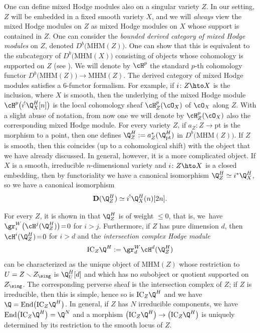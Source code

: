 One can define mixed Hodge modules also on a singular variety $Z$. In our setting, $Z$ will be embedded in a fixed smooth variety $X$,
and we will \emph{always} view the mixed Hodge modules on $Z$ as mixed Hodge modules on $X$
whose support is contained in $Z$. One can consider the \emph{bounded derived category of mixed Hodge modules} on $Z$, denoted $D^b\big(\mathrm{MHM}(Z)\big)$.
One can show that this is equivalent to the subcategory of $D^b\big(\mathrm{MHM}(X)\big)$ consisting of objects whose cohomology is supported on $Z$ (see \cite[Cor.\,2.23]{Saito_MHM}).
We will denote by $\cH^p$ the standard $p$-th cohomology functor $D^b\big(\mathrm{MHM}(Z)\big)\to \mathrm{MHM}(Z)$.
The derived category of mixed Hodge modules satisfies a 6-functor formalism. For example, if $i\colon Z\hto X$ is the inclusion, where $X$ is smooth, then the underlying \DXmodule of the mixed Hodge module $\cH^p\big(i^!\Q_X^H[n]\big)$
is the \hbox{local} cohomology sheaf $\cH^p_Z(\cO_X)$ of $\cO_X$ along $Z$. With a slight abuse of notation, from now one we will denote by $\cH^p_Z(\cO_X)$
also the corresponding mixed Hodge module.
For every variety $Z$, if $a_Z\colon Z\to \mathrm{pt}$ is the morphism to a point, then one defines $\Q_Z^H:=a_Z^*(\Q_\mathrm{pt}^H)$ in $D^b\big(\mathrm{MHM}(Z)\big)$. If $Z$ is smooth, then this coincides
(up to a cohomological shift) with the object that we have already discussed. In general, however, it is a more complicated object.
If $X$ is a smooth, irreducible $n$-dimensional variety and $i\colon Z\hto X$ is a closed embedding, then
by functoriality we have
a canonical isomorphism $\Q_Z^H\simeq i^*\Q_X^H$, so we have a canonical isomorphism
\begin{equation}\label{eq1_dual_Q}
{\mathbf D}(\Q_Z^H)\simeq i^!\Q_X^H(n)[2n].
\end{equation}

For every $Z$, it is shown in
\cite[\S 4.5]{Saito_MHM} that $\Q_Z^H$ is of weight $\leq 0$, that is, we~have $\gr^W_i\big(\cH^j(\Q_Z^H)\big)\!=\!0$ for $i\!>\!j$. Furthermore, if $Z$ has pure dimension $d$,
then $\cH^i(\Q_Z^H)\!=\!0$ for $i>d$ and the \emph{intersection complex Hodge module}
\begin{equation}\label{definition_IC}
\mathrm{IC}_Z\Q^H:=\gr^W_d\cH^d(\Q_Z^H)
\end{equation}
can be characterized as the unique object of $\mathrm{MHM}(Z)$ whose restriction to $U=Z\smallsetminus Z_\sing$ is $\Q_U^H[d]$ and which has no subobject or quotient supported on
$Z_\sing$. The corresponding perverse sheaf is the intersection complex of $Z$; if $Z$ is irreducible, then
this is simple, hence so is $\mathrm{IC}_Z\Q^H$ and we have $\Q=\mathrm{End}\big(\mathrm{IC}_Z\Q^H\big)$. In general, if $Z$ has $N$ irreducible
components, we have $\mathrm{End}\big(\mathrm{IC}_Z\Q^H\big)=\Q^N$ and a morphism $\big(\mathrm{IC}_Z\Q^H\big)\to \big(\mathrm{IC}_Z\Q^H\big)$
is uniquely determined by its restriction to the smooth locus of $Z$.

